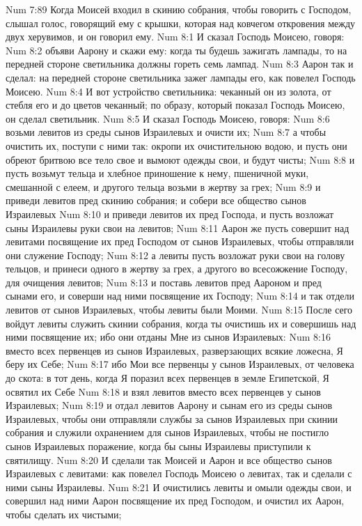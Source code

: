 Num 7:89  Когда Моисей входил в скинию собрания, чтобы говорить с Господом, слышал голос, говорящий ему с крышки, которая над ковчегом откровения между двух херувимов, и он говорил ему.
Num 8:1  И сказал Господь Моисею, говоря:
Num 8:2  объяви Аарону и скажи ему: когда ты будешь зажигать лампады, то на передней стороне светильника должны гореть семь лампад.
Num 8:3  Аарон так и сделал: на передней стороне светильника зажег лампады его, как повелел Господь Моисею.
Num 8:4  И вот устройство светильника: чеканный он из золота, от стебля его и до цветов чеканный; по образу, который показал Господь Моисею, он сделал светильник.
Num 8:5  И сказал Господь Моисею, говоря:
Num 8:6  возьми левитов из среды сынов Израилевых и очисти их;
Num 8:7  а чтобы очистить их, поступи с ними так: окропи их очистительною водою, и пусть они обреют бритвою все тело свое и вымоют одежды свои, и будут чисты;
Num 8:8  и пусть возьмут тельца и хлебное приношение к нему, пшеничной муки, смешанной с елеем, и другого тельца возьми в жертву за грех;
Num 8:9  и приведи левитов пред скинию собрания; и собери все общество сынов Израилевых
Num 8:10  и приведи левитов их пред Господа, и пусть возложат сыны Израилевы руки свои на левитов;
Num 8:11  Аарон же пусть совершит над левитами посвящение их пред Господом от сынов Израилевых, чтобы отправляли они служение Господу;
Num 8:12  а левиты пусть возложат руки свои на голову тельцов, и принеси одного в жертву за грех, а другого во всесожжение Господу, для очищения левитов;
Num 8:13  и поставь левитов пред Аароном и пред сынами его, и соверши над ними посвящение их Господу;
Num 8:14  и так отдели левитов от сынов Израилевых, чтобы левиты были Моими.
Num 8:15  После сего войдут левиты служить скинии собрания, когда ты очистишь их и совершишь над ними посвящение их; ибо они отданы Мне из сынов Израилевых:
Num 8:16  вместо всех первенцев из сынов Израилевых, разверзающих всякие ложесна, Я беру их Себе;
Num 8:17  ибо Мои все первенцы у сынов Израилевых, от человека до скота: в тот день, когда Я поразил всех первенцев в земле Египетской, Я освятил их Себе
Num 8:18  и взял левитов вместо всех первенцев у сынов Израилевых;
Num 8:19  и отдал левитов Аарону и сынам его из среды сынов Израилевых, чтобы они отправляли службы за сынов Израилевых при скинии собрания и служили охранением для сынов Израилевых, чтобы не постигло сынов Израилевых поражение, когда бы сыны Израилевы приступили к святилищу.
Num 8:20  И сделали так Моисей и Аарон и все общество сынов Израилевых с левитами: как повелел Господь Моисею о левитах, так и сделали с ними сыны Израилевы.
Num 8:21  И очистились левиты и омыли одежды свои, и совершил над ними Аарон посвящение их пред Господом, и очистил их Аарон, чтобы сделать их чистыми;
